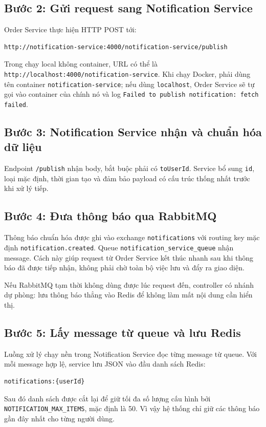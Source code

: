 \documentclass[12pt]{article}
\begin{document}
\subsection{Bước 2: Gửi request sang Notification Service}
Order Service thực hiện HTTP POST tới:
\begin{verbatim}
http://notification-service:4000/notification-service/publish
\end{verbatim}
Trong chạy local không container, URL có thể là \texttt{http://localhost:4000/notification-service}. Khi chạy Docker, phải dùng tên container \texttt{notification-service}; nếu dùng \texttt{localhost}, Order Service sẽ tự gọi vào container của chính nó và log \texttt{Failed to publish notification: fetch failed}.

\subsection{Bước 3: Notification Service nhận và chuẩn hóa dữ liệu}
Endpoint \texttt{/publish} nhận body, bắt buộc phải có \texttt{toUserId}. Service bổ sung \texttt{id}, loại mặc định, thời gian tạo và đảm bảo payload có cấu trúc thống nhất trước khi xử lý tiếp.

\subsection{Bước 4: Đưa thông báo qua RabbitMQ}
Thông báo chuẩn hóa được ghi vào exchange \texttt{notifications} với routing key mặc định \texttt{notification.created}. Queue \texttt{notification\_service\_queue} nhận message. Cách này giúp request từ Order Service kết thúc nhanh sau khi thông báo đã được tiếp nhận, không phải chờ toàn bộ việc lưu và đẩy ra giao diện.

Nếu RabbitMQ tạm thời không dùng được lúc request đến, controller có nhánh dự phòng: lưu thông báo thẳng vào Redis để không làm mất nội dung cần hiển thị.

\subsection{Bước 5: Lấy message từ queue và lưu Redis}
Luồng xử lý chạy nền trong Notification Service đọc từng message từ queue. Với mỗi message hợp lệ, service lưu JSON vào đầu danh sách Redis:
\begin{verbatim}
notifications:{userId}
\end{verbatim}
Sau đó danh sách được cắt lại để giữ tối đa số lượng cấu hình bởi \texttt{NOTIFICATION\_MAX\_ITEMS}, mặc định là 50. Vì vậy hệ thống chỉ giữ các thông báo gần đây nhất cho từng người dùng.
\end{document}
